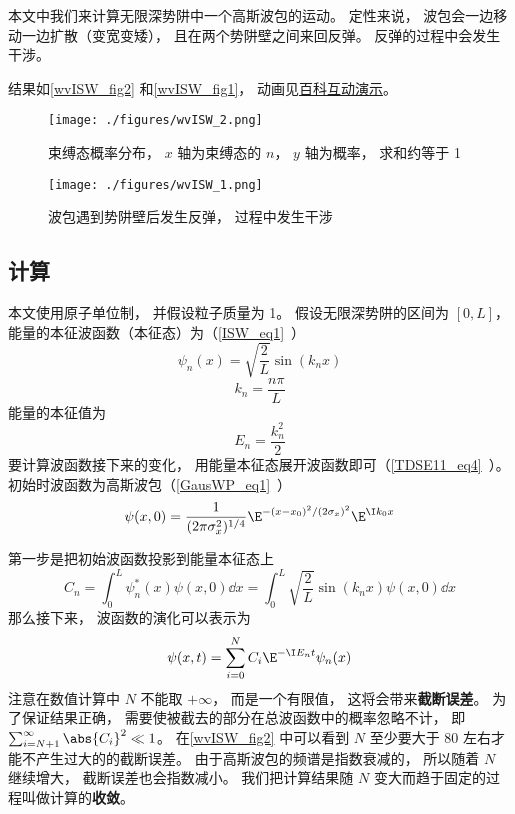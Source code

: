 

本文中我们来计算无限深势阱中一个高斯波包的运动。 定性来说， 波包会一边移动一边扩散（变宽变矮）， 且在两个势阱壁之间来回反弹。 反弹的过程中会发生干涉。

结果如\autoref{wvISW_fig2} 和\autoref{wvISW_fig1}， 动画见\href{https://wuli.wiki/apps/wvISW.html}{百科互动演示}。

\begin{figure}[ht]
\centering
\texttt{[image: ./figures/wvISW\_2.png]}
\caption{束缚态概率分布， $x$ 轴为束缚态的 $n$， $y$ 轴为概率， 求和约等于 1} \label{wvISW_fig2}
\end{figure}

\begin{figure}[ht]
\centering
\texttt{[image: ./figures/wvISW\_1.png]}
\caption{波包遇到势阱壁后发生反弹， 过程中发生干涉} \label{wvISW_fig1}
\end{figure}

\subsection{计算}

本文使用原子单位制， 并假设粒子质量为 1。 假设无限深势阱的区间为 $[0, L]$， 能量的本征波函数（本征态）为（\autoref{ISW_eq1}~）
\begin{equation}
\psi _n(x) = \sqrt{\frac{2}{L}} \sin(k_n x)
\end{equation}
\begin{equation}
k_n = \frac{n\pi }{L}
\end{equation}
能量的本征值为
\begin{equation}
E_n = \frac{k_n^2}{2}
\end{equation}
要计算波函数接下来的变化， 用能量本征态展开波函数即可（\autoref{TDSE11_eq4}~）。 初始时波函数为高斯波包（\autoref{GausWP_eq1}~）
\begin{equation}
\psi (x,0) = \frac{1}{(2\pi \sigma _x ^2)^{1/4}} \E^{-(x - x_0)^2/(2\sigma _x)^2} \E^{\I k_0x}
\end{equation}

第一步是把初始波函数投影到能量本征态上
\begin{equation}\label{wvISW_eq1}
C_n = \int_0^L \psi _n^*(x) \psi (x,0) \dd{x}
= \int_0^L \sqrt{\frac{2}{L}} \sin(k_n x) \psi (x,0) \dd{x}
\end{equation}
那么接下来， 波函数的演化可以表示为
\begin{equation}\label{wvISW_eq2}
\psi (x,t) = \sum _{i=0}^N C_i \E^{-\I E_n t} \psi _n(x)
\end{equation}
注意在数值计算中 $N$ 不能取 $+\infty$， 而是一个有限值， 这将会带来\textbf{截断误差}。 为了保证结果正确， 需要使被截去的部分在总波函数中的概率忽略不计， 即 $\sum_{i=N+1}^\infty \abs{C_i}^2 \ll 1$。 在\autoref{wvISW_fig2} 中可以看到 $N$ 至少要大于 80 左右才能不产生过大的的截断误差。 由于高斯波包的频谱是指数衰减的， 所以随着 $N$ 继续增大， 截断误差也会指数减小。 我们把计算结果随 $N$ 变大而趋于固定的过程叫做计算的\textbf{收敛}。

